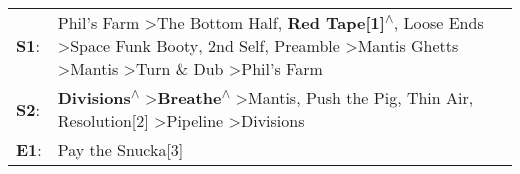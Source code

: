 \begin{supertabular}{p{0.03\textwidth}p{0.92\textwidth}}
 \textbf{S1}:  &  Phil's Farm\textsuperscript{} \textgreater \enspace The Bottom Half\textsuperscript{}, \enspace \textbf{Red Tape[1]\textsuperscript{$\wedge$}}, \enspace Loose Ends\textsuperscript{} \textgreater \enspace Space Funk Booty\textsuperscript{}, \enspace 2nd Self\textsuperscript{}, \enspace Preamble\textsuperscript{} \textgreater \enspace Mantis Ghetts\textsuperscript{} \textgreater \enspace Mantis\textsuperscript{} \textgreater \enspace Turn \& Dub\textsuperscript{} \textgreater \enspace Phil's Farm\textsuperscript{}  \enspace  \\
 \textbf{S2}:  &                                                                                                                                                \textbf{Divisions\textsuperscript{$\wedge$}} \textgreater \enspace \textbf{Breathe\textsuperscript{$\wedge$}} \textgreater \enspace Mantis\textsuperscript{}, \enspace Push the Pig\textsuperscript{}, \enspace Thin Air\textsuperscript{}, \enspace Resolution[2]\textsuperscript{} \textgreater \enspace Pipeline\textsuperscript{} \textgreater \enspace Divisions\textsuperscript{}  \enspace  \\
 \textbf{E1}:  &                                                                                                                                                                                                                                                                                                                                                                                                                                                                                                    Pay the Snucka[3]\textsuperscript{}  \enspace  \\
\end{supertabular}
